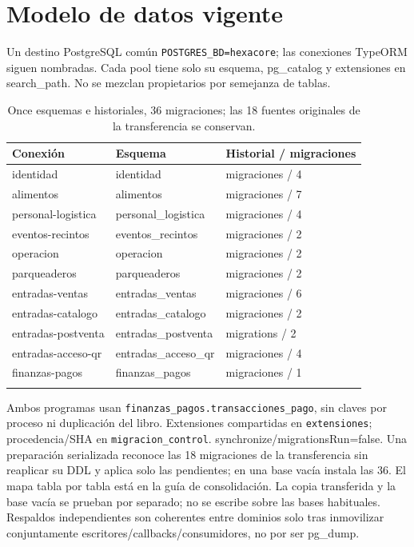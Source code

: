 \section{Modelo de datos vigente}
\label{sec:datos}
Un destino PostgreSQL común \texttt{POSTGRES\_BD=hexacore}; las conexiones TypeORM
siguen nombradas. Cada pool tiene solo su esquema, pg\_catalog y extensiones en
search\_path. No se mezclan propietarios por semejanza de tablas.
\begin{center}\begin{longtable}{p{4cm}p{4.8cm}p{4.5cm}}
\toprule Conexión & Esquema & Historial / migraciones\\\midrule\endhead
identidad & identidad & migraciones / 4\\
alimentos & alimentos & migraciones / 7\\
personal-logistica & personal\_logistica & migraciones / 4\\
eventos-recintos & eventos\_recintos & migraciones / 2\\
operacion & operacion & migraciones / 2\\
parqueaderos & parqueaderos & migraciones / 2\\
entradas-ventas & entradas\_ventas & migraciones / 6\\
entradas-catalogo & entradas\_catalogo & migraciones / 2\\
entradas-postventa & entradas\_postventa & migrations / 2\\
entradas-acceso-qr & entradas\_acceso\_qr & migraciones / 4\\
finanzas-pagos & finanzas\_pagos & migraciones / 1\\
\bottomrule\caption{Once esquemas e historiales, 36 migraciones; las 18 fuentes originales de la
transferencia se conservan.}
\end{longtable}\end{center}
Ambos programas usan \texttt{finanzas\_pagos.transacciones\_pago}, sin claves por
proceso ni duplicación del libro. Extensiones compartidas en \texttt{extensiones};
procedencia/SHA en \texttt{migracion\_control}. synchronize/migrationsRun=false.
Una preparación serializada reconoce las 18 migraciones de la transferencia sin
reaplicar su DDL y aplica solo las pendientes; en una base vacía instala las 36. El mapa tabla por tabla está en la guía de consolidación.
La copia transferida y la base vacía se prueban por separado; no se escribe sobre
las bases habituales. Respaldos independientes son coherentes entre dominios solo
tras inmovilizar conjuntamente escritores/callbacks/consumidores, no por ser pg\_dump.
